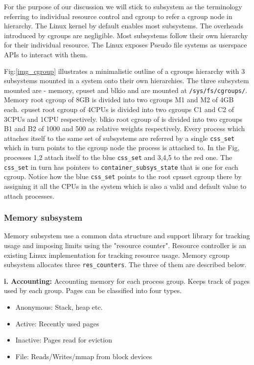       For the purpose of our discussion we will stick to subsystem as the terminology referring to individual resource control and cgroup 
to refer a cgroup node in hierarchy. The Linux kernel by default enables most subsystems. The overheads introduced by cgroups are 
negligible. Most subsystems follow their own hierarchy for their individual resource. The Linux exposes Pseudo file systems as userspace 
APIs to interact with them.

      Fig:\ref{img_cgroup} illustrates a minimalistic outline of a cgroups hierarchy with 3 subsystems mounted in a system onto their own 
  hierarchies. The three subsystem mounted are - memory, cpuset and blkio and are mounted at \texttt{/sys/fs/cgroups/}. Memory root cgroup 
of   8GB is divided into two cgroups M1 and M2 of 4GB each. cpuset root cgroup of 4CPUs is divided into two cgroups C1 and C2 of 3CPUs and 
1CPU respectively. blkio root cgroup of is divided into two cgroups B1 and B2 of 1000 and 500 as relative weights respectively. Every 
process   which attaches itself to the same set of subsystems are referred by a single \texttt{css\_set} which in turn points to the 
cgroup node the   process is attached to. In the Fig, processes 1,2 attach itself to the blue \texttt{css\_set} and 3,4,5 to the red one. 
The \texttt{css\_set} in turn has pointers to \texttt{container\_subsys\_state} that is one for each cgroup. Notice how the blue 
\texttt{css\_set} points to the   root cpuset cgroup there by assigning it all the CPUs in the system which is also a valid and 
default value to attach processes.
      
      \subsubsection{Memory subsystem}
	
	Memory subsystem use a common data structure and support library for tracking usage and imposing limits using the "resource 
counter". Resource controller is an existing Linux implementation for tracking resource usage. Memory cgroup subsystem allocates three 
\texttt{res\_counters}. The three of them are described below.

      \textbf{i. Accounting:} Accounting memory for each process group. Keeps track of pages used by each group. Pages can be classified 
into four types. 
      \begin{itemize}
	\item Anonymous: Stack, heap etc.
	\item Active: Recently used pages
	\item Inactive: Pages read for eviction
	\item File: Reads/Writes/mmap from block devices
      \end{itemize}
	
